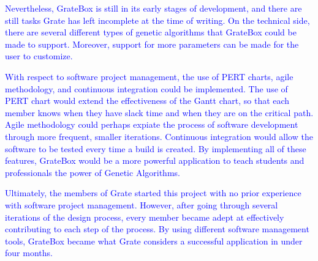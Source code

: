\documentclass{article}
\begin{document}
\textcolor{blue}{Nevertheless, GrateBox is still in its early stages of development, and there 
are still tasks Grate has left incomplete at the time of writing. On the 
technical side, there are several different types of genetic algorithms that 
GrateBox could be made to support. Moreover, support for more parameters can be 
made for the user to customize. }

\textcolor{blue}{With respect to software project management, the use of PERT charts, agile 
methodology, and continuous integration could be implemented. The use of PERT 
chart would extend the effectiveness of the Gantt chart, so that each member 
knows when they have slack time and when they are on the critical path. Agile 
methodology could perhaps expiate the process of software development through 
more frequent, smaller iterations. Continuous integration would allow the 
software to be tested every time a build is created. By implementing all of 
these features, GrateBox would be a more powerful application to teach students 
and professionals the power of Genetic Algorithms.}

\textcolor{blue}{Ultimately, the members of Grate started this project with no prior experience 
with software project management. However, after going through several 
iterations of the design process, every member became adept at effectively 
contributing to each step of the process. By using different software management 
tools, GrateBox became what Grate considers a successful application in under 
four months.}
\end{document}
